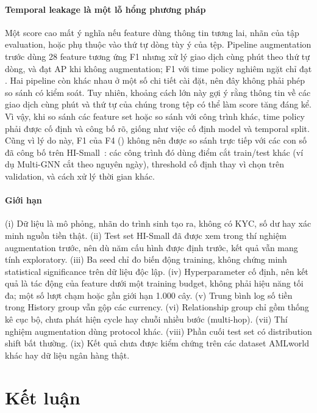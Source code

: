 \documentclass[sigconf,nonacm]{acmart}
\begin{document}
\paragraph{Temporal leakage là một lỗ hổng phương pháp} Một score cao mất ý nghĩa nếu feature dùng thông tin tương
lai, nhãn của tập evaluation, hoặc phụ thuộc vào thứ tự dòng tùy ý của tệp. Pipeline augmentation trước dùng 28
feature tương ứng F1 nhưng xử lý giao dịch cùng phút theo thứ tự dòng, và đạt AP \EZeroAP{} khi không augmentation;
F1 với time policy nghiêm ngặt chỉ đạt \FOneAP. Hai pipeline còn khác nhau ở một số chi tiết cài đặt, nên đây không
phải phép so sánh có kiểm soát. Tuy nhiên, khoảng cách lớn này gợi ý rằng thông tin về các giao dịch cùng phút và thứ
tự của chúng trong tệp có thể làm score tăng đáng kể. Vì vậy, khi so sánh các feature set hoặc so sánh với công trình
khác, time policy phải được cố định và công bố rõ, giống như việc cố định model và temporal split. Cũng vì lý do này,
F1 của F4 (\FFourFone) không nên được so sánh trực tiếp với các con số đã công bố trên HI-Small~\cite{blanusa2024gfp,
egressy2024multignn}: các công trình đó dùng điểm cắt train/test khác (ví dụ Multi-GNN cắt theo nguyên ngày), threshold
cố định thay vì chọn trên validation, và cách xử lý thời gian khác.

\paragraph{Giới hạn} (i) Dữ liệu là mô phỏng, nhãn do trình sinh tạo ra, không có KYC, số dư hay xác minh nguồn tiền
thật. (ii) Test set HI-Small đã được xem trong thí nghiệm augmentation trước, nên dù năm cấu hình được định trước, kết
quả vẫn mang tính exploratory. (iii) Ba seed chỉ đo biến động training, không chứng minh statistical significance trên
dữ liệu độc lập. (iv) Hyperparameter cố định, nên kết quả là tác động của feature dưới một training budget, không
phải hiệu năng tối đa; một số lượt chạm hoặc gần giới hạn 1.000 cây. (v) Trung bình log số tiền trong History group
vẫn gộp các currency. (vi) Relationship group chỉ gồm thống kê cục bộ, chưa phát hiện cycle hay chuỗi nhiều bước
(multi-hop). (vii) Thí nghiệm augmentation dùng protocol khác. (viii) Phần cuối test set có distribution shift bất
thường. (ix) Kết quả chưa được kiểm chứng trên các dataset AMLworld khác hay dữ liệu ngân hàng thật.

\section{Kết luận}
\end{document}
